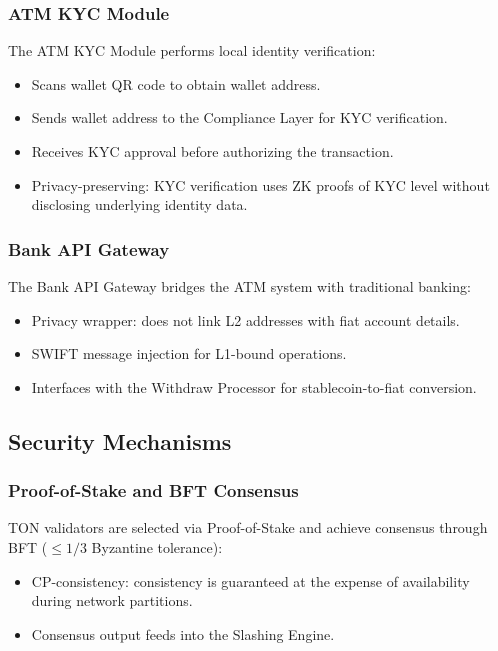 \documentclass[12pt,a4paper]{article}
\theoremstyle{definition}
\theoremstyle{remark}
\begin{document}
\subsubsection{ATM KYC Module}
\label{sec:atm-kyc}

The ATM KYC Module performs local identity verification:
\begin{itemize}[nosep]
    \item Scans wallet QR code to obtain wallet address.
    \item Sends wallet address to the Compliance Layer for KYC verification.
    \item Receives KYC approval before authorizing the transaction.
    \item Privacy-preserving: KYC verification uses ZK proofs of KYC level without disclosing underlying identity data.
\end{itemize}

\subsubsection{Bank API Gateway}

The Bank API Gateway bridges the ATM system with traditional banking:
\begin{itemize}[nosep]
    \item Privacy wrapper: does not link L2 addresses with fiat account details.
    \item SWIFT message injection for L1-bound operations.
    \item Interfaces with the Withdraw Processor for stablecoin-to-fiat conversion.
\end{itemize}

\subsection{Security Mechanisms}
\label{sec:security-mechanisms}

\subsubsection{Proof-of-Stake and BFT Consensus}

TON validators are selected via Proof-of-Stake and achieve consensus through BFT ($\leq 1/3$ Byzantine tolerance):
\begin{itemize}[nosep]
    \item CP-consistency: consistency is guaranteed at the expense of availability during network partitions.
    \item Consensus output feeds into the Slashing Engine.
\end{itemize}
\end{document}
